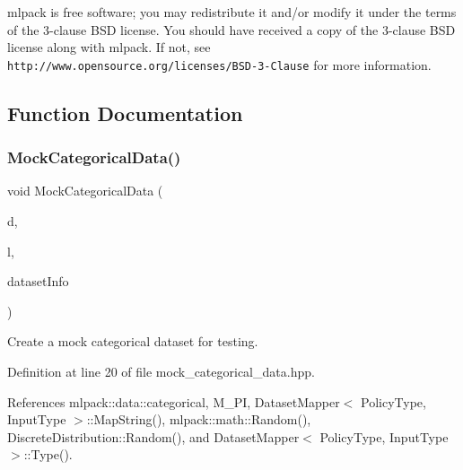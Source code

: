 mlpack is free software; you may redistribute it and/or modify it under the terms of the 3-\/clause B\+SD license. You should have received a copy of the 3-\/clause B\+SD license along with mlpack. If not, see {\tt http\+://www.\+opensource.\+org/licenses/\+B\+S\+D-\/3-\/\+Clause} for more information. 

\subsection{Function Documentation}
\mbox{\label{mock__categorical__data_8hpp_a93686590f9141a5c16d2cb8ff0eadde6}} 
\subsubsection{Mock\+Categorical\+Data()}
{\footnotesize\ttfamily void Mock\+Categorical\+Data (\begin{DoxyParamCaption}\item[{arma\+::mat \&}]{d,  }\item[{arma\+::\+Row$<$ size\+\_\+t $>$ \&}]{l,  }\item[{\textbf{ mlpack\+::data\+::\+Dataset\+Info} \&}]{dataset\+Info }\end{DoxyParamCaption})\hspace{0.3cm}{\ttfamily [inline]}}



Create a mock categorical dataset for testing. 



Definition at line 20 of file mock\+\_\+categorical\+\_\+data.\+hpp.



References mlpack\+::data\+::categorical, M\+\_\+\+PI, Dataset\+Mapper$<$ Policy\+Type, Input\+Type $>$\+::\+Map\+String(), mlpack\+::math\+::\+Random(), Discrete\+Distribution\+::\+Random(), and Dataset\+Mapper$<$ Policy\+Type, Input\+Type $>$\+::\+Type().

